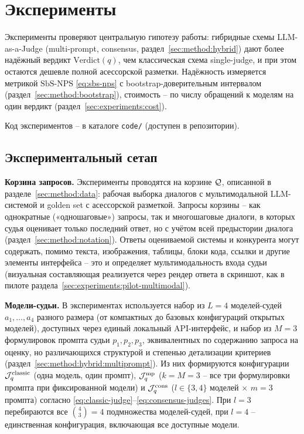 \chapter{Эксперименты}
\label{sec:experiments}

Эксперименты проверяют центральную гипотезу работы: гибридные схемы
LLM-as-a-Judge (multi-prompt, consensus, раздел~\ref{sec:method:hybrid})
дают более надёжный вердикт $\mathrm{Verdict}(q)$, чем классическая
схема single-judge, и при этом остаются дешевле полной асессорской
разметки.
Надёжность измеряется метрикой $\mathrm{SbS\text{-}NPS}$
\eqref{eq:sbs-nps} с bootstrap-доверительным интервалом
(раздел~\ref{sec:method:bootstrap}), стоимость -- по числу обращений к
моделям на один вердикт (раздел~\ref{sec:experiments:cost}).

Код экспериментов -- в каталоге \texttt{code/} (доступен в репозитории).

\section{Экспериментальный сетап}
\label{sec:experiments:setup}

\textbf{Корзина запросов.}
Эксперименты проводятся на корзине $\mathcal{Q}$, описанной в
разделе~\ref{sec:method:data}: рабочая выборка диалогов с
мультимодальной LLM-системой и golden set с асессорской разметкой.
Запросы корзины -- как однократные («одношаговые») запросы, так и
многошаговые диалоги, в которых судья оценивает только последний ответ, но
с учётом всей предыстории диалога (раздел~\ref{sec:method:notation}).
Ответы оцениваемой системы и конкурента могут содержать, помимо текста,
изображения, таблицы, блоки кода, ссылки и другие элементы интерфейса --
это и определяет мультимодальность входа судьи (визуальная составляющая
реализуется через рендер ответа в скриншот, как в пилоте
раздела~\ref{sec:experiments:pilot-multimodal}).

\textbf{Модели-судьи.}
В экспериментах используется набор из $L = 4$ моделей-судей
$a_1, \dots, a_4$ разного размера (от компактных до базовых конфигураций
открытых моделей), доступных через единый локальный API-интерфейс, и набор
из $M = 3$ формулировок промпта судьи $p_1, p_2, p_3$, эквивалентных по
содержанию запроса на оценку, но различающихся структурой и степенью
детализации критериев (раздел~\ref{sec:method:hybrid:multiprompt}).
Из них формируются конфигурации $\mathcal{J}_q^{\mathrm{classic}}$
(одна модель, один промпт), $\mathcal{J}_q^{\mathrm{mp}}$ ($k = M = 3$ -- все
три формулировки промпта при фиксированной модели) и
$\mathcal{J}_q^{\mathrm{cons}}$ ($l \in \{3, 4\}$ моделей $\times$ $m = 3$
промпта) согласно \eqref{eq:classic-judge}--\eqref{eq:consensus-judges}.
При $l = 3$ перебираются все $\binom{4}{3} = 4$ подмножества моделей-судей,
при $l = 4$ -- единственная конфигурация, включающая все доступные модели.

